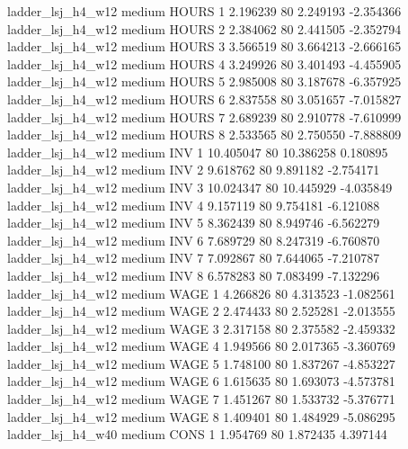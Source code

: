   ladder_lsj_h4_w12     medium    HOURS                 1  2.196239 80       2.249193          -2.354366
  ladder_lsj_h4_w12     medium    HOURS                 2  2.384062 80       2.441505          -2.352794
  ladder_lsj_h4_w12     medium    HOURS                 3  3.566519 80       3.664213          -2.666165
  ladder_lsj_h4_w12     medium    HOURS                 4  3.249926 80       3.401493          -4.455905
  ladder_lsj_h4_w12     medium    HOURS                 5  2.985008 80       3.187678          -6.357925
  ladder_lsj_h4_w12     medium    HOURS                 6  2.837558 80       3.051657          -7.015827
  ladder_lsj_h4_w12     medium    HOURS                 7  2.689239 80       2.910778          -7.610999
  ladder_lsj_h4_w12     medium    HOURS                 8  2.533565 80       2.750550          -7.888809
  ladder_lsj_h4_w12     medium      INV                 1 10.405047 80      10.386258           0.180895
  ladder_lsj_h4_w12     medium      INV                 2  9.618762 80       9.891182          -2.754171
  ladder_lsj_h4_w12     medium      INV                 3 10.024347 80      10.445929          -4.035849
  ladder_lsj_h4_w12     medium      INV                 4  9.157119 80       9.754181          -6.121088
  ladder_lsj_h4_w12     medium      INV                 5  8.362439 80       8.949746          -6.562279
  ladder_lsj_h4_w12     medium      INV                 6  7.689729 80       8.247319          -6.760870
  ladder_lsj_h4_w12     medium      INV                 7  7.092867 80       7.644065          -7.210787
  ladder_lsj_h4_w12     medium      INV                 8  6.578283 80       7.083499          -7.132296
  ladder_lsj_h4_w12     medium     WAGE                 1  4.266826 80       4.313523          -1.082561
  ladder_lsj_h4_w12     medium     WAGE                 2  2.474433 80       2.525281          -2.013555
  ladder_lsj_h4_w12     medium     WAGE                 3  2.317158 80       2.375582          -2.459332
  ladder_lsj_h4_w12     medium     WAGE                 4  1.949566 80       2.017365          -3.360769
  ladder_lsj_h4_w12     medium     WAGE                 5  1.748100 80       1.837267          -4.853227
  ladder_lsj_h4_w12     medium     WAGE                 6  1.615635 80       1.693073          -4.573781
  ladder_lsj_h4_w12     medium     WAGE                 7  1.451267 80       1.533732          -5.376771
  ladder_lsj_h4_w12     medium     WAGE                 8  1.409401 80       1.484929          -5.086295
  ladder_lsj_h4_w40     medium     CONS                 1  1.954769 80       1.872435           4.397144
